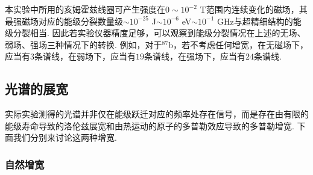 \documentclass[UTF8,a4paper,10pt]{article}
\begin{document}
本实验中所用的亥姆霍兹线圈可产生强度在$0\sim 10^{-2}$ T范围内连续变化的磁场，其最强磁场对应的能级分裂数量级$\sim 10^{-25}$ J$\sim 10^{-6}$ eV$\sim 10^{-1}$ GHz与超精细结构的能级分裂相当. 因此若实验仪器精度足够，可以观察到能级分裂情况在上述的无场、弱场、强场三种情况下的转换. 例如，对于$^{87}$b，若不考虑任何增宽，在无磁场下，应当有$3$条谱线，在弱场下，应当有$19$条谱线，在强场下，应当有$24$条谱线.

\subsection{光谱的展宽}

实际实验测得的光谱并非仅在能级跃迁对应的频率处存在信号，而是存在由有限的能级寿命导致的洛伦兹展宽和由热运动的原子的多普勒效应导致的多普勒增宽. 下面我们分别来讨论这两种增宽.

\subsubsection{自然增宽}
\end{document}
